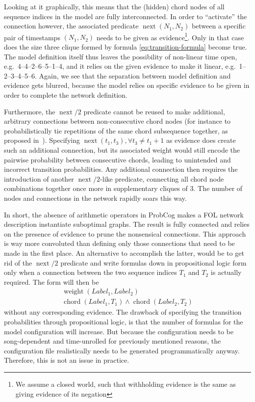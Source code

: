\documentclass[letterpaper]{article} %
\begin{document}
Looking at it graphically, this means that the (hidden) chord nodes of all sequence indices in the model are fully interconnected. In order to ``activate'' the connection however, the associated predicate $\operatorname{next}\left(N_1,N_2\right)$ between a specific pair of timestamps $\left(N_1,N_2\right)$ needs to be given as evidence\footnote{We assume a closed world, such that withholding evidence is the same as giving evidence of its negation}. Only in that case does the size three clique formed by formula \eqref{eq:transition-formula} become true. 
The model definition itself thus leaves the possibility of non-linear time open, e.g.\ 4--4--2--6--5--1--4, and it relies on the given evidence to make it linear, e.g.\ 1--2--3--4--5--6. Again, we see that the separation between model definition and evidence gets blurred, because the model relies on specific evidence to be given in order to complete the network definition.

Furthermore, the $\operatorname{next}/2$ predicate cannot be reused to make additional, arbitrary connections between non-consecutive chord nodes (for instance to probabilistically tie repetitions of the same chord subsequence together, as proposed in~\cite{papadopoulos2013icassp}). Specifying $\operatorname{next}\left(t_1,t_3\right),\forall t_3\neq t_1+1$ as evidence does create such an additional connection, but its associated weight would still encode the pairwise probability between consecutive chords, leading to unintended and incorrect transition probabilities. Any additional connection then requires the introduction of another $\operatorname{next}/2$-like predicate, connecting all chord node combinations together once more in supplementary cliques of 3. The number of nodes and connections in the network rapidly soars this way.

In short, the absence of arithmetic operators in ProbCog makes a FOL network description instantiate suboptimal graphs. The result is fully connected and relies on the presence of evidence to prune the nonsensical connections. This approach is way more convoluted than defining only those connections that need to be made in the first place. An alternative to accomplish the latter, would be to get rid of the $\operatorname{next}/2$ predicate and write formulas down in propositional logic form only when a connection between the two sequence indices $T_1$ and $T_2$ is actually required. The form will then be
\begin{multline}
\operatorname{weight}\left(Label_1,Label_2\right) \\ \operatorname{chord}\left(Label_1, T_1\right) \wedge \operatorname{chord}\left(Label_2, T_2\right)
\end{multline}
without any corresponding evidence. The drawback of specifying the transition probabilities through propositional logic, is that the number of formulas for the model configuration will increase. But because the configuration needs to be song-dependent and time-unrolled for previously mentioned reasons, the configuration file realistically needs to be generated programmatically anyway. Therefore, this is not an issue in practice.
\end{document}
